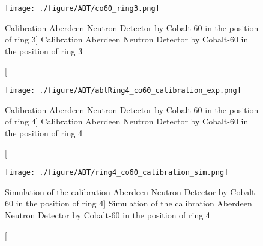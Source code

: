 \begin{figure}
    \centering
    \texttt{[image: ./figure/ABT/co60\_ring3.png]}
    \caption
    [Calibration Aberdeen Neutron Detector by Cobalt-60 in the position of ring 3]
    {Calibration Aberdeen Neutron Detector by Cobalt-60 in the position of ring 3}
    \label{fig:co60_ring3.png}
    \end{figure}






\begin{figure}
    \centering
    \texttt{[image: ./figure/ABT/abtRing4\_co60\_calibration\_exp.png]}
    \caption
    [Calibration Aberdeen Neutron Detector by Cobalt-60 in the position of ring 4]
    {Calibration Aberdeen Neutron Detector by Cobalt-60 in the position of ring 4}
    \label{fig:abtRing4_co60_calibration_exp.png}
    \end{figure}



\begin{figure}
    \centering
    \texttt{[image: ./figure/ABT/ring4\_co60\_calibration\_sim.png]}
    \caption
    [Simulation of the calibration Aberdeen Neutron Detector by Cobalt-60 in the position of ring 4]
    {Simulation of the calibration Aberdeen Neutron Detector by Cobalt-60 in the position of ring 4}
    \label{fig:ring4_co60_calibration_sim.png}
    \end{figure}
